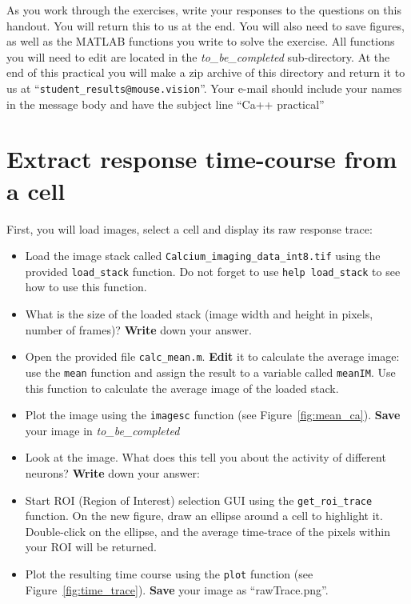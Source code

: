 \documentclass[paper=a4, fontsize=11pt]{article} %
\numberwithin{equation}{section} %
\numberwithin{figure}{section} %
\numberwithin{table}{section} %
\begin{document}
As you work through the exercises, write your responses to the questions on this handout.
You will return this to us at the end.
You will also need to save figures, as well as the MATLAB functions you write to solve the exercise.
All functions you will need to edit are located in the \emph{to\_be\_completed} sub-directory.
At the end of this practical you will make a zip archive of this directory and return it to us at ``\verb|student_results@mouse.vision|''.
Your e-mail should include your names in the message body and have the subject line ``Ca++ practical''


\section{Extract response time-course from a cell}

First, you will load images, select a cell and display its raw response trace:

\begin{itemize}
\item Load the image stack called \texttt{Calcium\_imaging\_data\_int8.tif} using the provided \texttt{load\_stack} function.
  Do not forget to use \texttt{help load\_stack} to see how to use this function.
\item What is the size of the loaded stack (image width and height in pixels, number of frames)? \textbf{Write} down your answer.
  \vspace{1em}
\item Open the provided file \texttt{calc\_mean.m}. \textbf{Edit} it to calculate the average image: use the \texttt{mean} function and assign the result to a variable called \texttt{meanIM}. Use this function to calculate the average image of the loaded stack.
\item Plot the image using the \texttt{imagesc} function (see Figure~\ref{fig:mean_ca}). \textbf{Save} your image in \emph{to\_be\_completed}
\item Look at the image. What does this tell you about the activity of different neurons? \textbf{Write} down your answer:
  \vspace{2em}
\item Start ROI (Region of Interest) selection GUI using the \texttt{get\_roi\_trace} function. On the new figure, draw an ellipse around a cell to highlight it. Double-click on the ellipse, and the average time-trace of the pixels within your ROI will be returned.
\item Plot the resulting time course using the \texttt{plot} function (see Figure~\ref{fig:time_trace}). \textbf{Save} your image as ``rawTrace.png''.
\end{itemize}
\end{document}
